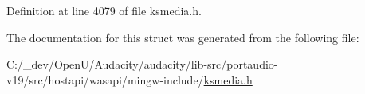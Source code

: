 Definition at line 4079 of file ksmedia.\+h.



The documentation for this struct was generated from the following file\+:\begin{DoxyCompactItemize}
\item 
C\+:/\+\_\+dev/\+Open\+U/\+Audacity/audacity/lib-\/src/portaudio-\/v19/src/hostapi/wasapi/mingw-\/include/\hyperlink{ksmedia_8h}{ksmedia.\+h}\end{DoxyCompactItemize}
